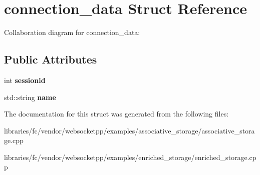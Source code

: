 \hypertarget{structconnection__data}{}\section{connection\+\_\+data Struct Reference}
\label{structconnection__data}


Collaboration diagram for connection\+\_\+data\+:
\subsection*{Public Attributes}
\begin{DoxyCompactItemize}
\item 
\mbox{\label{structconnection__data_aaa7435f644ad456b84123dedd50a2faa}} 
int {\bfseries sessionid}
\item 
\mbox{\label{structconnection__data_aef2f7b97910903dd40bfdf58adb3e9e9}} 
std\+::string {\bfseries name}
\end{DoxyCompactItemize}


The documentation for this struct was generated from the following files\+:\begin{DoxyCompactItemize}
\item 
libraries/fc/vendor/websocketpp/examples/associative\+\_\+storage/associative\+\_\+storage.\+cpp\item 
libraries/fc/vendor/websocketpp/examples/enriched\+\_\+storage/enriched\+\_\+storage.\+cpp\end{DoxyCompactItemize}
